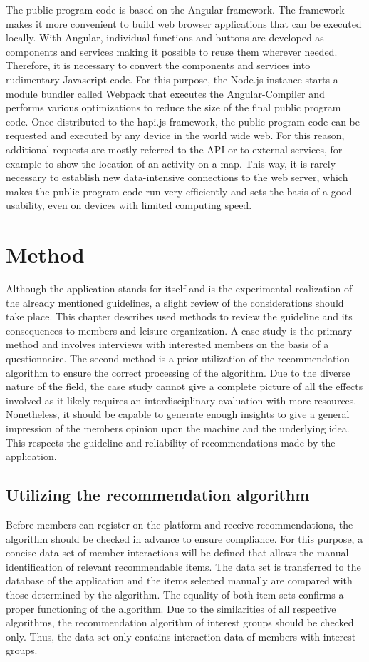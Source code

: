 \documentclass[12pt,numbers=noenddot,parskip,bibliography=totocnumbered,listof=totocnumbered,draft]{scrreprt}
\begin{document}
The public program code is based on the \mbox{Angular} \citep{angular} framework. The framework makes it more convenient to build web browser applications that can be executed locally. With \mbox{Angular}, individual functions and buttons are developed as components and services making it possible to reuse them wherever needed. Therefore, it is necessary to convert the components and services into rudimentary \mbox{Javascript} code. For this purpose, the \mbox{Node.js} instance starts a module bundler called \mbox{Webpack} \citep{webpack} that executes the \mbox{Angular}-Compiler and performs various optimizations to reduce the size of the final public program code. Once distributed to the \mbox{hapi.js} framework, the public program code can be requested and executed by any device in the world wide web. For this reason, additional requests are mostly referred to the API or to external services, for example to show the location of an activity on a map. This way, it is rarely necessary to establish new data-intensive connections to the web server, which makes the public program code run very efficiently and sets the basis of a good usability, even on devices with limited computing speed.

\chapter{Method}
Although the application stands for itself and is the experimental realization of the already mentioned guidelines, a slight review of the considerations should take place. This chapter describes used methods to review the guideline and its consequences to members and leisure organization. A case study is the primary method and involves interviews with interested members on the basis of a questionnaire. The second method is a prior utilization of the recommendation algorithm to ensure the correct processing of the algorithm. Due to the diverse nature of the field, the case study cannot give a complete picture of all the effects involved as it likely requires an interdisciplinary evaluation with more resources. Nonetheless, it should be capable to generate enough insights to give a general impression of the members opinion upon the machine and the underlying idea. This respects the guideline and reliability of recommendations made by the application.

\section{Utilizing the recommendation algorithm}
Before members can register on the platform and receive recommendations, the algorithm should be checked in advance to ensure compliance. For this purpose, a concise data set of member interactions will be defined that allows the manual identification of relevant recommendable items. The data set is transferred to the database of the application and the items selected manually are compared with those determined by the algorithm. The equality of both item sets confirms a proper functioning of the algorithm. Due to the similarities of all respective algorithms, the recommendation algorithm of interest groups should be checked only. Thus, the data set only contains interaction data of members with interest groups.
\end{document}
